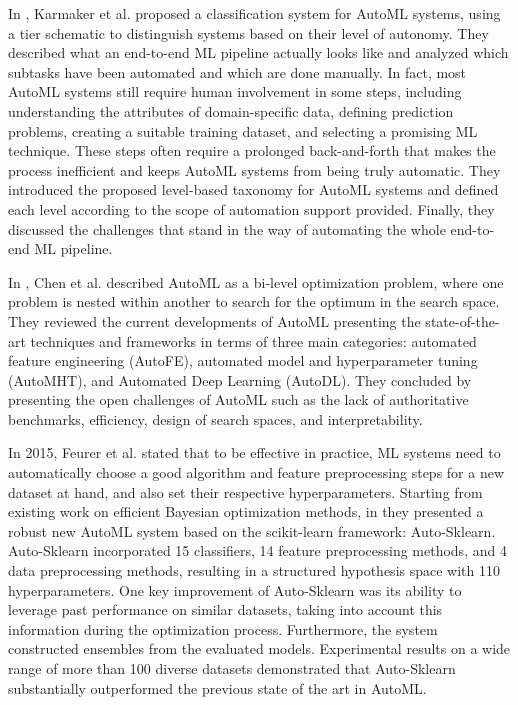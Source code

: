 In \cite{Karmaker2021}, Karmaker et al. proposed a classification system for AutoML systems, using a tier schematic to distinguish systems based on their level of autonomy.
They described what an end-to-end ML pipeline actually looks like and analyzed which subtasks have been automated and which are done manually.
In fact, most AutoML systems still require human involvement in some steps, including understanding the attributes of domain-specific data, defining prediction problems, creating a suitable training dataset, and selecting a promising ML technique.
These steps often require a prolonged back-and-forth that makes the process inefficient and keeps AutoML systems from being truly automatic.
They introduced the proposed level-based taxonomy for AutoML systems and defined each level according to the scope of automation support provided.
Finally, they discussed the challenges that stand in the way of automating the whole end-to-end ML pipeline.

In \cite{Chen2021}, Chen et al. described AutoML as a bi-level optimization problem, where one problem is nested within another to search for the optimum in the search space.
They reviewed the current developments of AutoML presenting the state-of-the-art techniques and frameworks in terms of three main categories:
automated feature engineering (AutoFE),
automated model and hyperparameter tuning (AutoMHT),
and Automated Deep Learning (AutoDL).
They concluded by presenting the open challenges of AutoML such as the lack of authoritative benchmarks, efficiency, design of search spaces, and interpretability.

In 2015, Feurer et al. stated that to be effective in practice, ML systems need to automatically choose a good algorithm and feature preprocessing steps for a new dataset at hand, and also set their respective hyperparameters.
Starting from existing work on efficient Bayesian optimization methods, in \cite{Feurer2015} they presented a robust new AutoML system based on the scikit-learn framework: Auto-Sklearn.
Auto-Sklearn incorporated 15 classifiers, 14 feature preprocessing methods, and 4 data preprocessing methods, resulting in a structured hypothesis space with 110 hyperparameters.
One key improvement of Auto-Sklearn was its ability to leverage past performance on similar datasets, taking into account this information during the optimization process.
Furthermore, the system constructed ensembles from the evaluated models.
Experimental results on a wide range of more than 100 diverse datasets demonstrated that Auto-Sklearn substantially outperformed the previous state of the art in AutoML.

